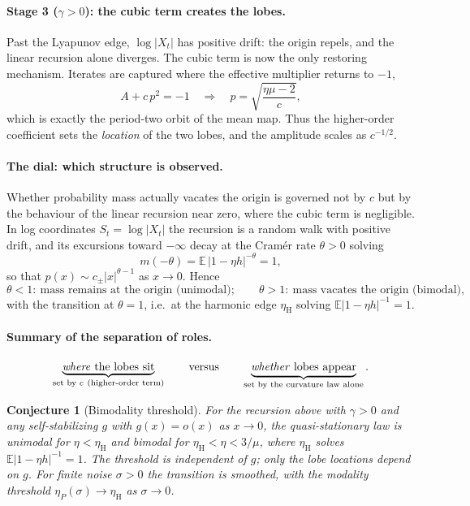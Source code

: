 \documentclass{article} %
\theoremstyle{plain}
\newtheorem{conjecture}{Conjecture}
\theoremstyle{definition}
\begin{document}
\begin{itemize}[nosep,leftmargin=*]
\paragraph{Stage 3 ($\gamma>0$): the cubic term creates the lobes.}
Past the Lyapunov edge, $\log|X_t|$ has positive drift: the origin repels, and
the linear recursion alone diverges. The cubic term is now the only
restoring mechanism. Iterates are captured where the effective multiplier
returns to $-1$,
\[
A+c\,p^2=-1
\quad\Longrightarrow\quad
p=\sqrt{\frac{\eta\mu-2}{c}},
\]
which is exactly the period-two orbit of the mean map. Thus the higher-order
coefficient sets the \emph{location} of the two lobes, and the amplitude
scales as $c^{-1/2}$.

\paragraph{The dial: which structure is observed.}
Whether probability mass actually vacates the origin is governed not by $c$ but
by the behaviour of the linear recursion near zero, where the cubic term is
negligible. In log coordinates $S_t=\log|X_t|$ the recursion is a random walk
with positive drift, and its excursions toward $-\infty$ decay at the
Cram\'er rate $\theta>0$ solving
\[
m(-\theta)=\mathbb E\,|1-\eta h|^{-\theta}=1 ,
\]
so that $p(x)\sim c_\pm|x|^{\theta-1}$ as $x\to0$. Hence
\[
\theta<1:\ \text{mass remains at the origin (unimodal)};\qquad
\theta>1:\ \text{mass vacates the origin (bimodal)},
\]
with the transition at $\theta=1$, i.e.\ at the harmonic edge
$\eta_{\mathrm H}$ solving $\mathbb E|1-\eta h|^{-1}=1$.

\paragraph{Summary of the separation of roles.}
\[
\underbrace{\text{\emph{where} the lobes sit}}_{\text{set by }c\ (\text{higher-order term})}
\qquad\text{versus}\qquad
\underbrace{\text{\emph{whether} lobes appear}}_{\text{set by the curvature law alone}} .
\]

\begin{conjecture}[Bimodality threshold]
For the recursion above with $\gamma>0$ and any self-stabilizing $g$ with
$g(x)=o(x)$ as $x\to0$, the quasi-stationary law is unimodal for
$\eta<\eta_{\mathrm H}$ and bimodal for $\eta_{\mathrm H}<\eta<3/\mu$, where
$\eta_{\mathrm H}$ solves $\mathbb E|1-\eta h|^{-1}=1$. The threshold is
independent of $g$; only the lobe locations depend on $g$. For finite noise
$\sigma>0$ the transition is smoothed, with the modality threshold
$\eta_P(\sigma)\to\eta_{\mathrm H}$ as $\sigma\to0$.
\end{conjecture}



\end{itemize}
\end{document}
